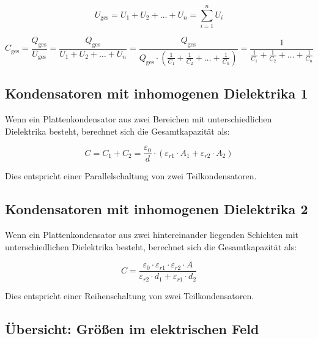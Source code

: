 \documentclass[
  11pt,
]{article}
\begin{document}
\[U_{\text{ges}} = U_1 + U_2 + \dots + U_n = \sum_{i=1}^n U_i\]

\[C_{\text{ges}} = \frac{Q_{\text{ges}}}{U_{\text{ges}}} = \frac{Q_{\text{ges}}}{U_1 + U_2 + \dots + U_n} =  \frac{Q_{\text{ges}}}{Q_{\text{ges}} \cdot \left(\frac{1}{C_1} + \frac{1}{C_2} + \dots + \frac{1}{C_n}\right)} = \frac{1}{\frac{1}{C_1} + \frac{1}{C_2} + \dots + \frac{1}{C_n}}\]

\subsection{Kondensatoren mit inhomogenen Dielektrika
1}\label{kondensatoren-mit-inhomogenen-dielektrika-1}

Wenn ein Plattenkondensator aus zwei Bereichen mit unterschiedlichen
Dielektrika besteht, berechnet sich die Gesamtkapazität als:

\[C = C_1 + C_2 = \frac{\varepsilon_0}{d} \cdot \left(\varepsilon_{r1} \cdot A_1 + \varepsilon_{r2} \cdot A_2\right)\]

Dies entspricht einer Parallelschaltung von zwei Teilkondensatoren.

\subsection{Kondensatoren mit inhomogenen Dielektrika
2}\label{kondensatoren-mit-inhomogenen-dielektrika-2}

Wenn ein Plattenkondensator aus zwei hintereinander liegenden Schichten
mit unterschiedlichen Dielektrika besteht, berechnet sich die
Gesamtkapazität als:

\[C = \frac{\varepsilon_0 \cdot \varepsilon_{r1} \cdot \varepsilon_{r2} \cdot A}{\varepsilon_{r2} \cdot d_1 + \varepsilon_{r1} \cdot d_2}\]

Dies entspricht einer Reihenschaltung von zwei Teilkondensatoren.

\subsection{Übersicht: Größen im elektrischen
Feld}\label{uxfcbersicht-gruxf6uxdfen-im-elektrischen-feld}
\end{document}
